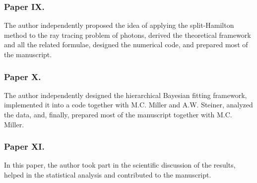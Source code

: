 \subsubsection*{Paper IX.}
The author independently proposed the idea of applying the split-Hamilton method to the ray tracing problem of photons, derived the theoretical framework and all the related formulae, designed the numerical code, and prepared most of the manuscript.


\subsubsection*{Paper X.}
The author independently designed the hierarchical Bayesian fitting framework, implemented it into a code together with M.C. Miller and A.W. Steiner, analyzed the data, and, finally, prepared most of the manuscript together with M.C. Miller.


\subsubsection*{Paper XI.}
In this paper, the author took part in the scientific discussion of the results, helped in the statistical analysis and contributed to the manuscript.


